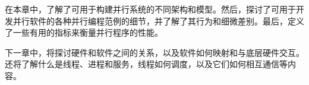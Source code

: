 在本章中，了解了可用于构建并行系统的不同架构和模型。然后，探讨了可用于开发并行软件的各种并行编程范例的细节，并了解了其行为和细微差别。最后，定义了一些有用的指标来衡量并行程序的性能。

下一章中，将探讨硬件和软件之间的关系，以及软件如何映射和与底层硬件交互。还将了解什么是线程、进程和服务，线程如何调度，以及它们如何相互通信等内容。